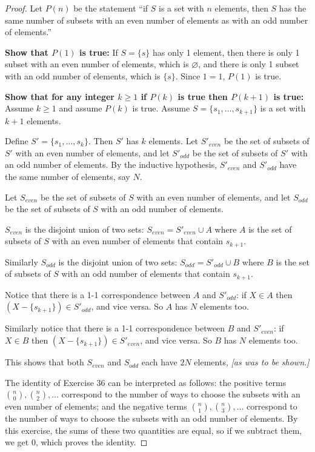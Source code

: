 \documentclass[14pt]{extarticle}
\newcommand{\es}{\varnothing}
\begin{document}
\begin{proof}
Let \(P(n)\) be the statement ``if \(S\) is a set with \(n\) elements, then \(S\) has the same number of subsets with an 
even number of elements as with an odd number of elements.''

{\bf Show that \(P(1)\) is true:} If \(S = \{s\}\) has only 1 element, then there is only 1 subset with an even number of
elements, which is \(\es\), and there is only 1 subset with an odd number of elements, which is \(\{s\}\). Since \(1=1\),
\(P(1)\) is true.

{\bf Show that for any integer \(k \geq 1\) if \(P(k)\) is true then \(P(k+1)\) is true:} Assume \(k \geq 1\) and assume
\(P(k)\) is true. Assume \(S = \{s_1, \ldots, s_{k+1}\}\) is a set with \(k+1\) elements.

Define \(S' = \{s_1, \ldots, s_k\}\). Then \(S'\) has \(k\) elements. Let \(S'_{even}\) be the set of subsets of \(S'\) 
with an even number of elements, and let \(S'_{odd}\) be the set of subsets of \(S'\) with an odd number of elements. By 
the inductive hypothesis, \(S'_{even}\) and \(S'_{odd}\) have the same number of elements, say \(N\). 

Let \(S_{even}\) be the set of subsets of \(S\) with an even number of elements, and let \(S_{odd}\) be the set of subsets 
of \(S\) with an odd number of elements.

\(S_{even}\) is the disjoint union of two sets: \(S_{even} = S'_{even} \cup A\) where \(A\) is the set of subsets of \(S\) with an even number of elements that contain \(s_{k+1}\).

Similarly \(S_{odd}\) is the disjoint union of two sets: \(S_{odd} = S'_{odd} \cup B\) where \(B\) is the set of subsets 
of \(S\) with an odd number of elements that contain \(s_{k+1}\).

Notice that there is a 1-1 correspondence between \(A\) and \(S'_{odd}\): if \(X \in A\) then \((X - \{s_{k+1}\}) \in 
S'_{odd}\), and vice versa. So \(A\) has \(N\) elements too.

Similarly notice that there is a 1-1 correspondence between \(B\) and \(S'_{even}\): if \(X \in B\) then \((X - \{s_{k+1}\}) \in S'_{even}\), and vice versa. So \(B\) has \(N\) elements too.

This shows that both \(S_{even}\) and \(S_{odd}\) each have \(2N\) elements, {\it [as was to be shown.]}

The identity of Exercise 36 can be interpreted as follows: the positive terms \(\binom{n}{0},\binom{n}{2},\ldots\) correspond 
to the number of ways to choose the subsets with an even number of elements; and the negative terms \(\binom{n}{1}, 
\binom{n}{3}, \ldots\) correspond to the number of ways to choose the subsets with an odd number of elements. By this 
exercise, the sums of these two quantities are equal, so if we subtract them, we get 0, which proves the identity.
\end{proof}
\end{document}
